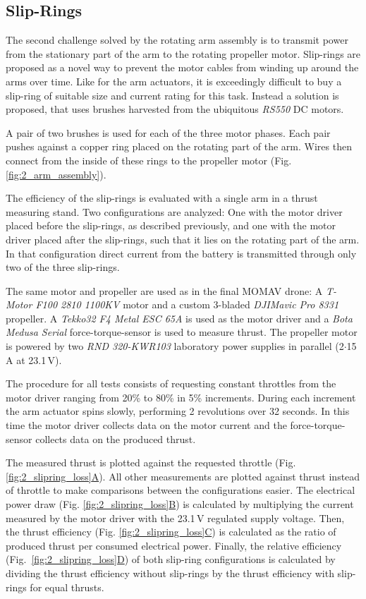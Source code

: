 \documentclass[conference]{IEEEtran}
\begin{document}
\subsection{Slip-Rings}
The second challenge solved by the rotating arm assembly is to transmit power from the stationary part of the arm to the rotating propeller motor. Slip-rings are proposed as a novel way to prevent the motor cables from winding up around the arms over time. Like for the arm actuators, it is exceedingly difficult to buy a slip-ring of suitable size and current rating for this task. Instead a solution is proposed, that uses brushes harvested from the ubiquitous \textit{RS550} DC motors.
\par
A pair of two brushes is used for each of the three motor phases. Each pair pushes against a copper ring placed on the rotating part of the arm. Wires then connect from the inside of these rings to the propeller motor (Fig. \ref{fig:2_arm_assembly}). 
\par
The efficiency of the slip-rings is evaluated with a single arm in a thrust measuring stand. Two configurations are analyzed: One with the motor driver placed before the slip-rings, as described previously, and one with the motor driver placed after the slip-rings, such that it lies on the rotating part of the arm. In that configuration direct current from the battery is transmitted through only two of the three slip-rings.
\par
The same motor and propeller are used as in the final MOMAV drone: A \textit{T-Motor F100 2810 1100KV} motor and a custom 3-bladed \textit{DJIMavic Pro 8331} propeller. A \textit{Tekko32 F4 Metal ESC 65A} is used as the motor driver and a \textit{Bota Medusa Serial} force-torque-sensor is used to measure thrust. The propeller motor is powered by two \textit{RND 320-KWR103} laboratory power supplies in parallel (2$\cdot$15\,A at 23.1\,V).
\par
The procedure for all tests consists of requesting constant throttles from the motor driver ranging from 20\% to 80\% in 5\% increments. During each increment the arm actuator spins slowly, performing 2 revolutions over 32 seconds. In this time the motor driver collects data on the motor current and the force-torque-sensor collects data on the produced thrust.
\par
The measured thrust is plotted against the requested throttle (Fig. \hyperref[fig:2_slipring_loss]{\ref*{fig:2_slipring_loss}A}). All other measurements are plotted against thrust instead of throttle to make comparisons between the configurations easier. The electrical power draw (Fig. \hyperref[fig:2_slipring_loss]{\ref*{fig:2_slipring_loss}B}) is calculated by multiplying the current measured by the motor driver with the 23.1\,V regulated supply voltage. Then, the thrust efficiency (Fig. \hyperref[fig:2_slipring_loss]{\ref*{fig:2_slipring_loss}C}) is calculated as the ratio of produced thrust per consumed electrical power. Finally, the relative efficiency \mbox{(Fig. \hyperref[fig:2_slipring_loss]{\ref*{fig:2_slipring_loss}D})} of both slip-ring configurations is calculated by dividing the thrust efficiency without slip-rings by the thrust efficiency with slip-rings for equal thrusts.
\end{document}
